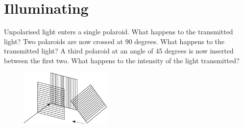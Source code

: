 \section{Illuminating} %
	\label{sec:illuminating}
	Unpolarised light enters a single polaroid. What happens to the transmitted light? Two polaroids are now crossed at 90 degrees. What happens to the transmitted light? A third polaroid at an angle of 45 degrees is now inserted between the first two. What happens to the intensity of the light transmitted?
	\begin{figure}[ht]
	  \centering
	  \includegraphics[width=0.4\textwidth]{polarisation.pdf}
	\end{figure}
